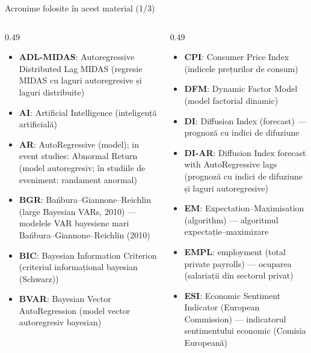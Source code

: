 {
\begin{frame}[noframenumbering]
    \titlepage
\end{frame}
}
\begin{frame}{Acronime folosite în acest material (1/3)}
\begin{columns}[T]
\begin{column}{0.49\textwidth}
\begin{itemize}\setlength{\itemsep}{0pt}
    \item \textbf{ADL-MIDAS}: Autoregressive Distributed Lag MIDAS (regresie MIDAS cu laguri autoregresive și laguri distribuite)
    \item \textbf{AI}: Artificial Intelligence (inteligență artificială)
    \item \textbf{AR}: AutoRegressive (model); in event studies: Abnormal Return (model autoregresiv; în studiile de eveniment: randament anormal)
    \item \textbf{BGR}: Bańbura–Giannone–Reichlin (large Bayesian VARs, 2010) — modelele VAR bayesiene mari Bańbura–Giannone–Reichlin (2010)
    \item \textbf{BIC}: Bayesian Information Criterion (criteriul informațional bayesian (Schwarz))
    \item \textbf{BVAR}: Bayesian Vector AutoRegression (model vector autoregresiv bayesian)
\end{itemize}
\end{column}
\begin{column}{0.49\textwidth}
\begin{itemize}\setlength{\itemsep}{0pt}
    \item \textbf{CPI}: Consumer Price Index (indicele prețurilor de consum)
    \item \textbf{DFM}: Dynamic Factor Model (model factorial dinamic)
    \item \textbf{DI}: Diffusion Index (forecast) — prognoză cu indici de difuziune
    \item \textbf{DI-AR}: Diffusion Index forecast with AutoRegressive lags (prognoză cu indici de difuziune și laguri autoregresive)
    \item \textbf{EM}: Expectation–Maximisation (algorithm) — algoritmul expectație–maximizare
    \item \textbf{EMPL}: employment (total private payrolls) — ocuparea (salariații din sectorul privat)
    \item \textbf{ESI}: Economic Sentiment Indicator (European Commission) — indicatorul sentimentului economic (Comisia Europeană)
\end{itemize}
\end{column}
\end{columns}
\end{frame}
